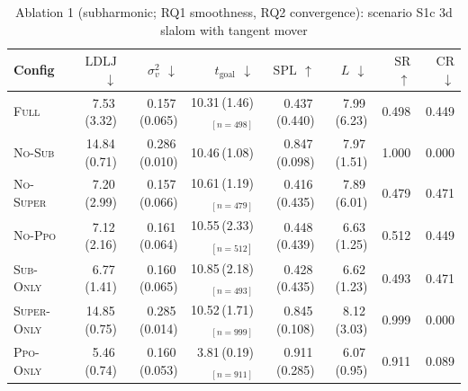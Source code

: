 \begin{table}[h]
\centering
\small
\caption{Ablation 1 (subharmonic; RQ1 smoothness, RQ2 convergence): scenario S1c 3d slalom with tangent mover}
\label{tab:abl1:S1c_3d_slalom_with_tangent_mover}
\begin{tabular}{lrrrrrrr}
\toprule
Config & $\mathrm{LDLJ}$ $\downarrow$ & $\sigma^2_v$ $\downarrow$ & $t_{\mathrm{goal}}$ $\downarrow$ & $\mathrm{SPL}$ $\uparrow$ & $L$ $\downarrow$ & $\mathrm{SR}$ $\uparrow$ & $\mathrm{CR}$ $\downarrow$ \\
\midrule
\textsc{Full} & 7.53\,(3.32) & 0.157\,(0.065) & 10.31\,(1.46)$_{[n=498]}$ & 0.437\,(0.440) & 7.99\,(6.23) & 0.498 & 0.449 \\
\textsc{No-Sub} & 14.84\,(0.71) & 0.286\,(0.010) & 10.46\,(1.08) & 0.847\,(0.098) & 7.97\,(1.51) & 1.000 & 0.000 \\
\textsc{No-Super} & 7.20\,(2.99) & 0.157\,(0.066) & 10.61\,(1.19)$_{[n=479]}$ & 0.416\,(0.435) & 7.89\,(6.01) & 0.479 & 0.471 \\
\textsc{No-Ppo} & 7.12\,(2.16) & 0.161\,(0.064) & 10.55\,(2.33)$_{[n=512]}$ & 0.448\,(0.439) & 6.63\,(1.25) & 0.512 & 0.449 \\
\textsc{Sub-Only} & 6.77\,(1.41) & 0.160\,(0.065) & 10.85\,(2.18)$_{[n=493]}$ & 0.428\,(0.435) & 6.62\,(1.23) & 0.493 & 0.471 \\
\textsc{Super-Only} & 14.85\,(0.75) & 0.285\,(0.014) & 10.52\,(1.71)$_{[n=999]}$ & 0.845\,(0.108) & 8.12\,(3.03) & 0.999 & 0.000 \\
\textsc{Ppo-Only} & 5.46\,(0.74) & 0.160\,(0.053) & 3.81\,(0.19)$_{[n=911]}$ & 0.911\,(0.285) & 6.07\,(0.95) & 0.911 & 0.089 \\
\bottomrule
\end{tabular}
\end{table}